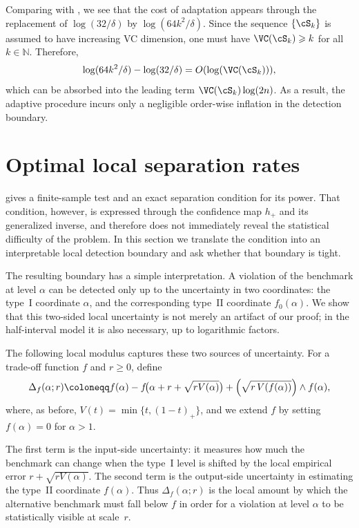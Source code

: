 \documentclass[english]{article}
\theoremstyle{plain}
\theoremstyle{definition}
\newcommand{\fnull}{f_0}
\begin{document}
Comparing  with
, we see that the cost of adaptation appears through
the replacement of \(\log(32/\delta)\) by \(\log(64k^2/\delta)\). Since the
sequence \(\{\cS_k\}\) is assumed to have increasing VC dimension, one must
have \(\VC(\cS_k)\geqslant k\) for all \(k\in\mathbb N\). Therefore,
\[
\log(64k^2/\delta)-\log(32/\delta)=O(\log(\VC(\cS_k))),
\]
which can be absorbed into the leading term \(\VC(\cS_k)\log(2n)\). As a
result, the adaptive procedure incurs only a negligible order-wise inflation in
the detection boundary.

\section{Optimal local separation rates}\label{sec:rates}

 gives a finite-sample test and an exact separation
condition for its power. That condition, however, is expressed through the
confidence map \(h_+\) and its generalized inverse, and therefore does not
immediately reveal the statistical difficulty of the problem. In this section
we translate the condition into an interpretable local detection boundary and
ask whether that boundary is tight.

The resulting boundary has a simple interpretation. A violation of the
benchmark at level \(\alpha\) can be detected only up to the uncertainty in two
coordinates: the type~I coordinate \(\alpha\), and the corresponding type~II
coordinate \(\fnull(\alpha)\). We show that this two-sided local uncertainty is
not merely an artifact of our proof; in the half-interval model it is also
necessary, up to logarithmic factors.



The following local modulus captures these two sources of uncertainty. For a
trade-off function \(f\) and \(r\geqslant 0\), define
\begin{align}
\Delta_f(\alpha;r)
\coloneqq 
f(\alpha)-f\!\bigl(\alpha+r+\sqrt{rV(\alpha)}\bigr)
+
\Bigl(\sqrt{r\,V(f(\alpha))}\Bigr)\wedge f(\alpha),
\label{eq:local-modulus}
\end{align}
where, as before, \(V(t)=\min\{t,(1-t)_+\}\), and we extend \(f\) by setting
\(f(\alpha)=0\) for \(\alpha>1\).


The first term is the input-side uncertainty: it measures how much the benchmark
can change when the type~I level is shifted by the local empirical error
\(r+\sqrt{rV(\alpha)}\). The second term is the output-side uncertainty in
estimating the type~II coordinate \(f(\alpha)\). Thus
\(\Delta_f(\alpha;r)\) is the local amount by which the alternative benchmark
must fall below \(f\) in order for a violation at level \(\alpha\) to be
statistically visible at scale~\(r\).
\end{document}
